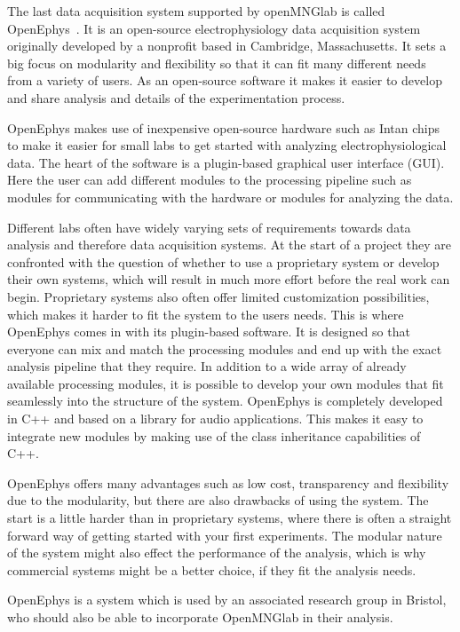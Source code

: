 The last data acquisition system supported by openMNGlab is called OpenEphys~\cite{openEphys}. It is an open-source electrophysiology data acquisition system originally developed by a nonprofit based in Cambridge, Massachusetts. It sets a big focus on modularity and flexibility so that it can fit many different needs from a variety of users. As an open-source software it makes it easier to develop and share analysis and details of the experimentation process.

OpenEphys makes use of inexpensive open-source hardware such as Intan chips~\cite{openEphys} to make it easier for small labs to get started with analyzing electrophysiological data. The heart of the software is a plugin-based graphical user interface (GUI). Here the user can add different modules to the processing pipeline such as modules for communicating with the hardware or modules for analyzing the data.

Different labs often have widely varying sets of requirements towards data analysis and therefore data acquisition systems. At the start of a project they are confronted with the question of whether to use a proprietary system or develop their own systems, which will result in much more effort before the real work can begin. Proprietary systems also often offer limited customization possibilities, which makes it harder to fit the system to the users needs. This is where OpenEphys comes in with its plugin-based software. It is designed so that everyone can mix and match the processing modules and end up with the exact analysis pipeline that they require. In addition to a wide array of already available processing modules, it is possible to develop your own modules that fit seamlessly into the structure of the system. OpenEphys is completely developed in C++ and based on a library for audio applications. This makes it easy to integrate new modules by making use of the class inheritance capabilities of C++.

OpenEphys offers many advantages such as low cost, transparency and flexibility due to the modularity, but there are also drawbacks of using the system. The start is a little harder than in proprietary systems, where there is often a straight forward way of getting started with your first experiments. The modular nature of the system might also effect the performance of the analysis, which is why commercial systems might be a better choice, if they fit the analysis needs.

OpenEphys is a system which is used by an associated research group in Bristol, who should also be able to incorporate OpenMNGlab in their analysis.

